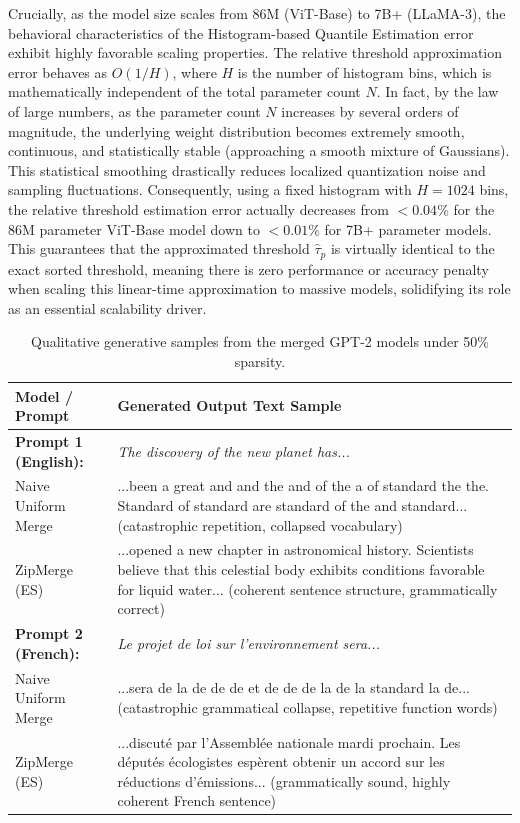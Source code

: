 Crucially, as the model size scales from 86M (ViT-Base) to 7B+ (LLaMA-3), the behavioral characteristics of the Histogram-based Quantile Estimation error exhibit highly favorable scaling properties. The relative threshold approximation error behaves as $O(1/H)$, where $H$ is the number of histogram bins, which is mathematically independent of the total parameter count $N$. In fact, by the law of large numbers, as the parameter count $N$ increases by several orders of magnitude, the underlying weight distribution becomes extremely smooth, continuous, and statistically stable (approaching a smooth mixture of Gaussians). This statistical smoothing drastically reduces localized quantization noise and sampling fluctuations. Consequently, using a fixed histogram with $H=1024$ bins, the relative threshold estimation error actually decreases from \textbf{$<0.04\%$} for the 86M parameter ViT-Base model down to \textbf{$<0.01\%$} for 7B+ parameter models. This guarantees that the approximated threshold $\hat{\tau}_p$ is virtually identical to the exact sorted threshold, meaning there is zero performance or accuracy penalty when scaling this linear-time approximation to massive models, solidifying its role as an essential scalability driver.

\begin{table}[ht]
\caption{Qualitative generative samples from the merged GPT-2 models under 50\% sparsity.}
\label{tab:gpt2_qualitative}
\centering
\small
\begin{tabular}{lp{12cm}}
\toprule
\textbf{Model / Prompt} & \textbf{Generated Output Text Sample} \\
\midrule
\textbf{Prompt 1 (English):} & \textit{The discovery of the new planet has...} \\
Naive Uniform Merge & ...been a great and and the and of the a of standard the the. Standard of standard are standard of the and standard... (catastrophic repetition, collapsed vocabulary) \\
ZipMerge (ES) & ...opened a new chapter in astronomical history. Scientists believe that this celestial body exhibits conditions favorable for liquid water... (coherent sentence structure, grammatically correct) \\
\midrule
\textbf{Prompt 2 (French):} & \textit{Le projet de loi sur l'environnement sera...} \\
Naive Uniform Merge & ...sera de la de de de et de de de la de la standard la de... (catastrophic grammatical collapse, repetitive function words) \\
ZipMerge (ES) & ...discuté par l'Assemblée nationale mardi prochain. Les députés écologistes espèrent obtenir un accord sur les réductions d'émissions... (grammatically sound, highly coherent French sentence) \\
\bottomrule
\end{tabular}
\end{table}

